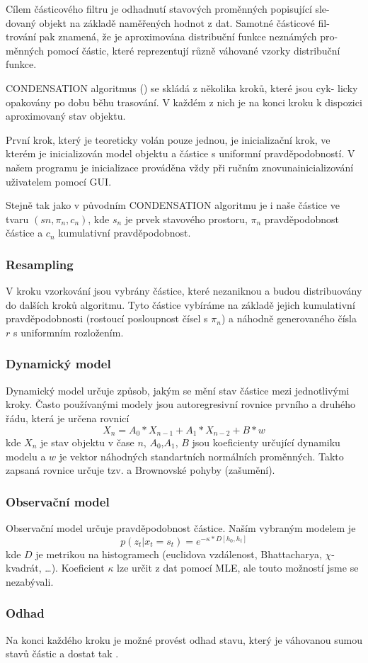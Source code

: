 Cílem částicového filtru je odhadnutí stavových proměnných popisující sle-
dovaný objekt na základě naměřených hodnot z dat. Samotné částicové fil-
trování pak znamená, že je aproximována distribuční funkce neznámých pro-
měnných pomocí částic, které reprezentují různě váhované vzorky distribuční
funkce.

CONDENSATION algoritmus (\cite{isard98}) se skládá z několika kroků, které jsou cyk-
licky opakovány po dobu běhu trasování. V každém z nich je na konci kroku
k dispozici aproximovaný stav objektu.

První krok, který je teoreticky volán pouze jednou, je inicializační
krok, ve kterém je inicializován model objektu a částice
s uniformní pravděpodobností. V našem programu je inicializace prováděna
vždy při ručním znovunainicializování uživatelem pomocí GUI.

Stejně tak jako v původním CONDENSATION algoritmu je i naše částice
ve tvaru $(sn , \pi_n, c_n )$, kde $s_n$ je prvek stavového prostoru, $\pi_n$ pravděpodobnost
částice a $c_n$ kumulativní pravděpodobnost.

\subsubsection*{Resampling}
  V kroku vzorkování jsou vybrány částice, které nezaniknou a budou distribuovány
  do dalších kroků algoritmu. Tyto částice vybíráme na základě jejich kumulativní 
  pravděpodobnosti (rostoucí posloupnost čísel s $\pi_n$) a náhodně generovaného čísla
  $r$ s uniformním rozložením.

\subsubsection*{Dynamický model}
  Dynamický model určuje způsob, jakým se mění stav částice mezi jednotlivými kroky.
  Často používanými modely jsou autoregresivní rovnice prvního a druhého řádu, která 
  je určena rovnicí 
  $$X_{n} = A_0 * X_{n-1} + A_1 * X_{n-2} + B * w$$
  kde $X_n$ je stav objektu v čase $n$, $A_0$,$A_1$, $B$ jsou koeficienty určující 
  dynamiku modelu a $w$ je vektor náhodných standartních normálních proměnných.
  Takto zapsaná rovnice určuje tzv.  a Brownovské pohyby
  (zašumění).
  
\subsubsection*{Observační model}
  Observační model určuje pravděpodobnost částice. Naším vybraným modelem je 
  $$p(z_t | x_t = s_t) = e^{-\kappa * D[h_0, h_t]}$$
  kde $D$ je metrikou na histogramech (euclidova vzdálenost, Bhattacharya, $\chi$-kvadrát, \ldots).
  Koeficient $\kappa$ lze určit z dat pomocí MLE, ale touto možností jsme se nezabývali.

\subsubsection*{Odhad}
  Na konci každého kroku je možné provést odhad stavu, který je váhovanou sumou 
  stavů částic a dostat tak .
